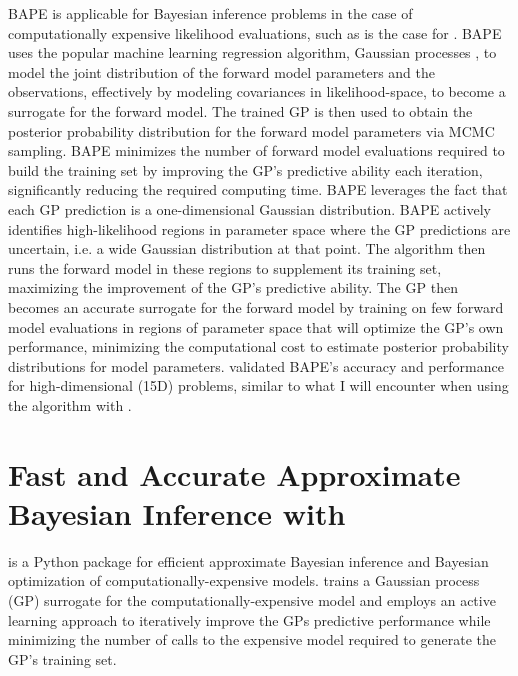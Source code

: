 BAPE is applicable for Bayesian inference problems in the case of computationally expensive likelihood evaluations, such as is the case for \vplanet.  BAPE uses the popular machine learning regression algorithm, Gaussian processes \citep[GP,][]{Rasmussen2006}, to model the joint distribution of the forward model parameters and the observations, effectively by modeling covariances in likelihood-space, to become a surrogate for the forward model. The trained GP is then used to obtain the posterior probability distribution for the forward model parameters via MCMC sampling.  BAPE minimizes the number of forward model evaluations required to build the training set by improving the GP's predictive ability each iteration, significantly reducing the required computing time.  BAPE leverages the fact that each GP prediction is a one-dimensional Gaussian distribution.  BAPE actively identifies high-likelihood regions in parameter space where the GP predictions are uncertain, i.e. a wide Gaussian distribution at that point.  The algorithm then runs the forward model in these regions to supplement its training set, maximizing the improvement of the GP's predictive ability.  The GP then becomes an accurate surrogate for the forward model by training on few forward model evaluations in regions of parameter space that will optimize the GP's own performance, minimizing the computational cost to estimate posterior probability distributions for model parameters.  \citet{Kandasamy2017} validated BAPE's accuracy and performance for high-dimensional (15D) problems, similar to what I will encounter when using the algorithm with \vplanet.

\section{Fast and Accurate Approximate Bayesian Inference with \approxposterior}

\approxposterior is a Python package for efficient approximate Bayesian inference and Bayesian optimization of computationally-expensive models. \approxposterior trains a Gaussian process (GP) surrogate for the computationally-expensive model and employs an active learning approach to iteratively improve the GPs predictive performance while minimizing the number of calls to the expensive model required to generate the GP's training set.

